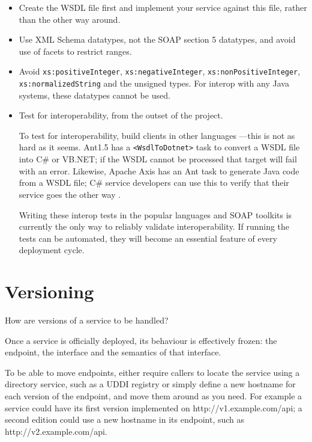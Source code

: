 \documentclass[draft]{report}
\begin{document}
\begin{itemize}

\item Create the WSDL file first and implement your service against this
file, rather than the other way around.

\item Use XML Schema datatypes, not the SOAP section 5 datatypes, and
avoid use of facets to restrict ranges.

\item Avoid \verb$xs:positiveInteger$, \verb$xs:negativeInteger$,
\verb$xs:nonPositiveInteger$, \verb$xs:normalizedString$ and the
unsigned types. For interop with any Java systems, these datatypes
cannot be used.

\item Test for interoperability, from the outset of the project.

To test for interoperability, build clients in other languages ---this
is not as hard as it seems. Ant1.5 has a \verb|<WsdlToDotnet>| task to
convert a WSDL file into C\# or VB.NET; if the WSDL cannot be processed
that target will fail with an error. Likewise, Apache Axis has an Ant
task to generate Java code from a WSDL file; C\# service developers can
use this to verify that their service goes the other way
\cite{loughran:antbook}.

Writing these interop tests in the popular languages and SOAP toolkits
is currently the only way to reliably validate interoperability. If
running the tests can be automated, they will become an essential
feature of every deployment cycle.

\end{itemize}

\chapter{Versioning}

How are versions of a service to be handled?

Once a service is officially deployed, its behaviour is effectively
frozen: the endpoint, the interface and the semantics of that interface.


To be able to move endpoints, either require callers to locate the
service using a directory service, such as a UDDI registry or simply
define a new hostname for each version of the endpoint, and move them
around as you need. For example a service could have its first version
implemented on http://v1.example.com/api; a second edition could use a
new hostname in its endpoint, such as http://v2.example.com/api.
\end{document}
